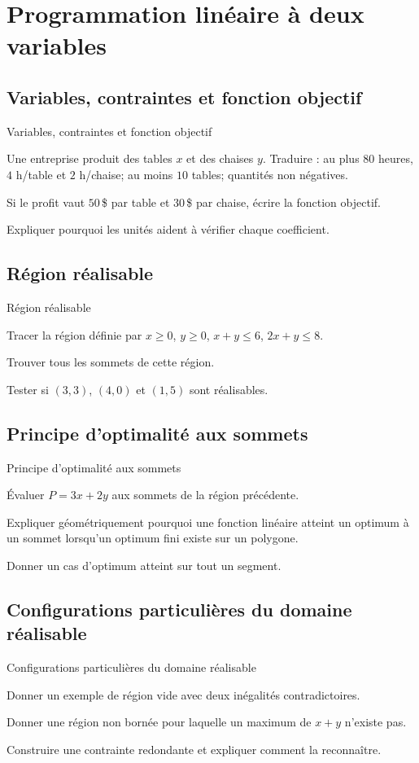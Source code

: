 \chapter{Programmation linéaire à deux variables}
\label{workbook:chapter:13}
\section{Variables, contraintes et fonction objectif}
\label{workbook:section:13.01}
\begin{exerciseblock}{Variables, contraintes et fonction objectif}
\item Une entreprise produit des tables $x$ et des chaises $y$. Traduire : au plus $80$ heures, $4$ h/table et $2$ h/chaise; au moins $10$ tables; quantités non négatives.
\item Si le profit vaut $50\,$\$ par table et $30\,$\$ par chaise, écrire la fonction objectif.
\item Expliquer pourquoi les unités aident à vérifier chaque coefficient.
\end{exerciseblock}
\section{Région réalisable}
\label{workbook:section:13.02}
\begin{exerciseblock}{Région réalisable}
\item Tracer la région définie par $x\ge0$, $y\ge0$, $x+y\le6$, $2x+y\le8$.
\item Trouver tous les sommets de cette région.
\item Tester si $(3,3)$, $(4,0)$ et $(1,5)$ sont réalisables.
\end{exerciseblock}
\section{Principe d'optimalité aux sommets}
\label{workbook:section:13.03}
\begin{exerciseblock}{Principe d'optimalité aux sommets}
\item Évaluer $P=3x+2y$ aux sommets de la région précédente.
\item Expliquer géométriquement pourquoi une fonction linéaire atteint un optimum à un sommet lorsqu'un optimum fini existe sur un polygone.
\item Donner un cas d'optimum atteint sur tout un segment.
\end{exerciseblock}
\section{Configurations particulières du domaine réalisable}
\label{workbook:section:13.04}
\begin{exerciseblock}{Configurations particulières du domaine réalisable}
\item Donner un exemple de région vide avec deux inégalités contradictoires.
\item Donner une région non bornée pour laquelle un maximum de $x+y$ n'existe pas.
\item Construire une contrainte redondante et expliquer comment la reconnaître.
\end{exerciseblock}
